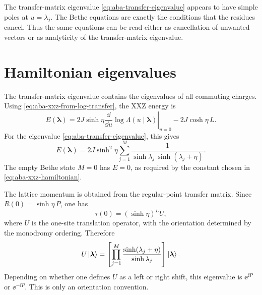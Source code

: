 \begin{principle}
The transfer-matrix eigenvalue \cref{eq:aba-transfer-eigenvalue} appears to have
simple poles at $u=\lambda_j$.  The Bethe equations are exactly the conditions
that the residues cancel.  Thus the same equations can be read either as
cancellation of unwanted vectors or as analyticity of the transfer-matrix
eigenvalue.
\end{principle}

\section{Hamiltonian eigenvalues}
\label{sec:aba-hamiltonian-eigenvalues}

The transfer-matrix eigenvalue contains the eigenvalues of all commuting charges.
Using \cref{eq:aba-xxz-from-log-transfer}, the XXZ energy is
\begin{equation}
\label{eq:aba-energy-from-transfer-eigenvalue}
    E(\boldsymbol{\lambda})
    =
    2J\sinh\eta
    \left.
    \frac{\dd}{\dd u}
    \log\Lambda(u\mid\boldsymbol{\lambda})
    \right|_{u=0}
    -2J\cosh\eta\,L .
\end{equation}
For the eigenvalue \cref{eq:aba-transfer-eigenvalue}, this gives
\begin{equation}
\label{eq:aba-energy-rapidity-form}
\boxed{
    E(\boldsymbol{\lambda})
    =
    2J\sinh^2\eta
    \sum_{j=1}^{M}
    \frac{1}{\sinh\lambda_j\,\sinh(\lambda_j+\eta)} .
}
\end{equation}
The empty Bethe state $M=0$ has $E=0$, as required by the constant chosen in
\cref{eq:aba-xxz-hamiltonian}.

The lattice momentum is obtained from the regular-point transfer matrix.  Since
$R(0)=\sinh\eta\,P$, one has
\begin{equation}
\label{eq:aba-transfer-at-zero-translation}
    \tau(0)=(\sinh\eta)^L U,
\end{equation}
where $U$ is the one-site translation operator, with the orientation determined
by the monodromy ordering.  Therefore
\begin{equation}
\label{eq:aba-momentum-from-roots}
    U\left|\boldsymbol{\lambda}\right\rangle
    =
    \left[
    \prod_{j=1}^{M}
    \frac{\sinh(\lambda_j+\eta)}{\sinh\lambda_j}
    \right]
    \left|\boldsymbol{\lambda}\right\rangle .
\end{equation}
Depending on whether one defines $U$ as a left or right shift, this eigenvalue is
$\ee^{\ii P}$ or $\ee^{-\ii P}$.  This is only an orientation convention.

